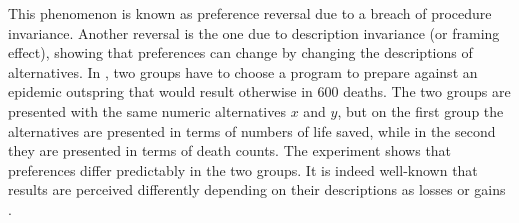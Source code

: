 \documentclass[version=last, pagesize, twocolumn, twoside=off, bibliography=totoc, 12pt, a4paper, english]{scrartcl}
\newcommand{\dollars}[1]{\SI{#1}[\$]{}}
\newcommand{\simplebet}[3]{(\dollars{#1}, #2; \dollars{#3})}
\begin{document}

This phenomenon is known as preference reversal due to a breach of procedure invariance. Another reversal is the one due to description invariance (or framing effect), showing that preferences can change by changing the descriptions of alternatives. In \citet{tversky_framing_1981}, two groups have to choose a  program to prepare against an epidemic outspring that would result otherwise in 600 deaths. The two groups are presented with the same numeric alternatives $x$ and $y$, but on the first group the alternatives are presented in terms of numbers of life saved, while in the second they are presented in terms of death counts. The experiment shows that preferences differ predictably in the two groups. It is indeed well-known that results are perceived differently depending on their descriptions as losses or gains \citet{thaler_toward_1980}.
\end{document}
